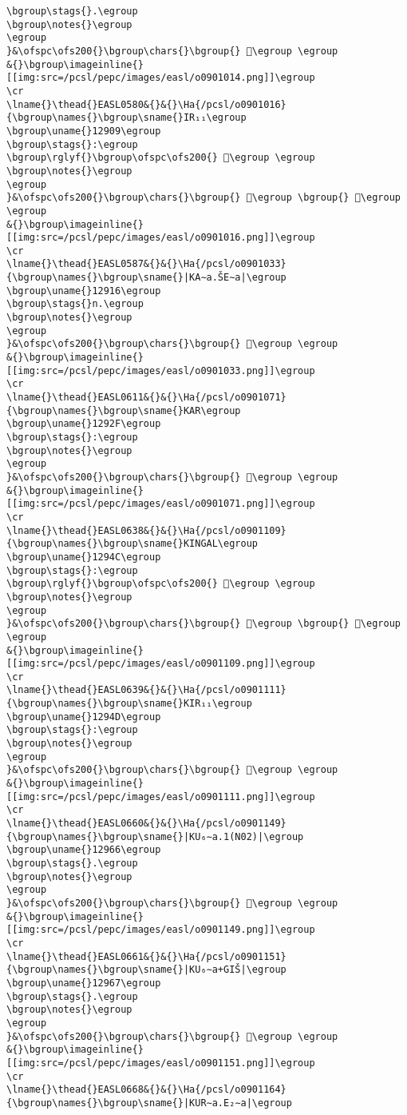 \begin{verbatim}
\bgroup\stags{}.\egroup
\bgroup\notes{}\egroup
\egroup
}&\ofspc\ofs200{}\bgroup\chars{}\bgroup{} 𒤄\egroup \egroup
&{}\bgroup\imageinline{}[[img:src=/pcsl/pepc/images/easl/o0901014.png]]\egroup
\cr
\lname{}\thead{}EASL0580&{}&{}\Ha{/pcsl/o0901016}{\bgroup\names{}\bgroup\sname{}IR₁₁\egroup
\bgroup\uname{}12909\egroup
\bgroup\stags{}:\egroup
\bgroup\rglyf{}\bgroup\ofspc\ofs200{} 𒤉\egroup \egroup
\bgroup\notes{}\egroup
\egroup
}&\ofspc\ofs200{}\bgroup\chars{}\bgroup{} 𒤈\egroup \bgroup{} 𒤉\egroup \egroup
&{}\bgroup\imageinline{}[[img:src=/pcsl/pepc/images/easl/o0901016.png]]\egroup
\cr
\lname{}\thead{}EASL0587&{}&{}\Ha{/pcsl/o0901033}{\bgroup\names{}\bgroup\sname{}|KA∼a.ŠE∼a|\egroup
\bgroup\uname{}12916\egroup
\bgroup\stags{}n.\egroup
\bgroup\notes{}\egroup
\egroup
}&\ofspc\ofs200{}\bgroup\chars{}\bgroup{} 𒤖\egroup \egroup
&{}\bgroup\imageinline{}[[img:src=/pcsl/pepc/images/easl/o0901033.png]]\egroup
\cr
\lname{}\thead{}EASL0611&{}&{}\Ha{/pcsl/o0901071}{\bgroup\names{}\bgroup\sname{}KAR\egroup
\bgroup\uname{}1292F\egroup
\bgroup\stags{}:\egroup
\bgroup\notes{}\egroup
\egroup
}&\ofspc\ofs200{}\bgroup\chars{}\bgroup{} 𒤯\egroup \egroup
&{}\bgroup\imageinline{}[[img:src=/pcsl/pepc/images/easl/o0901071.png]]\egroup
\cr
\lname{}\thead{}EASL0638&{}&{}\Ha{/pcsl/o0901109}{\bgroup\names{}\bgroup\sname{}KINGAL\egroup
\bgroup\uname{}1294C\egroup
\bgroup\stags{}:\egroup
\bgroup\rglyf{}\bgroup\ofspc\ofs200{} 𒥌\egroup \egroup
\bgroup\notes{}\egroup
\egroup
}&\ofspc\ofs200{}\bgroup\chars{}\bgroup{} 𒥋\egroup \bgroup{} 𒥌\egroup \egroup
&{}\bgroup\imageinline{}[[img:src=/pcsl/pepc/images/easl/o0901109.png]]\egroup
\cr
\lname{}\thead{}EASL0639&{}&{}\Ha{/pcsl/o0901111}{\bgroup\names{}\bgroup\sname{}KIR₁₁\egroup
\bgroup\uname{}1294D\egroup
\bgroup\stags{}:\egroup
\bgroup\notes{}\egroup
\egroup
}&\ofspc\ofs200{}\bgroup\chars{}\bgroup{} 𒥍\egroup \egroup
&{}\bgroup\imageinline{}[[img:src=/pcsl/pepc/images/easl/o0901111.png]]\egroup
\cr
\lname{}\thead{}EASL0660&{}&{}\Ha{/pcsl/o0901149}{\bgroup\names{}\bgroup\sname{}|KU₆∼a.1(N02)|\egroup
\bgroup\uname{}12966\egroup
\bgroup\stags{}.\egroup
\bgroup\notes{}\egroup
\egroup
}&\ofspc\ofs200{}\bgroup\chars{}\bgroup{} 𒥦\egroup \egroup
&{}\bgroup\imageinline{}[[img:src=/pcsl/pepc/images/easl/o0901149.png]]\egroup
\cr
\lname{}\thead{}EASL0661&{}&{}\Ha{/pcsl/o0901151}{\bgroup\names{}\bgroup\sname{}|KU₆∼a+GIŠ|\egroup
\bgroup\uname{}12967\egroup
\bgroup\stags{}.\egroup
\bgroup\notes{}\egroup
\egroup
}&\ofspc\ofs200{}\bgroup\chars{}\bgroup{} 𒥧\egroup \egroup
&{}\bgroup\imageinline{}[[img:src=/pcsl/pepc/images/easl/o0901151.png]]\egroup
\cr
\lname{}\thead{}EASL0668&{}&{}\Ha{/pcsl/o0901164}{\bgroup\names{}\bgroup\sname{}|KUR∼a.E₂∼a|\egroup

\end{verbatim}
